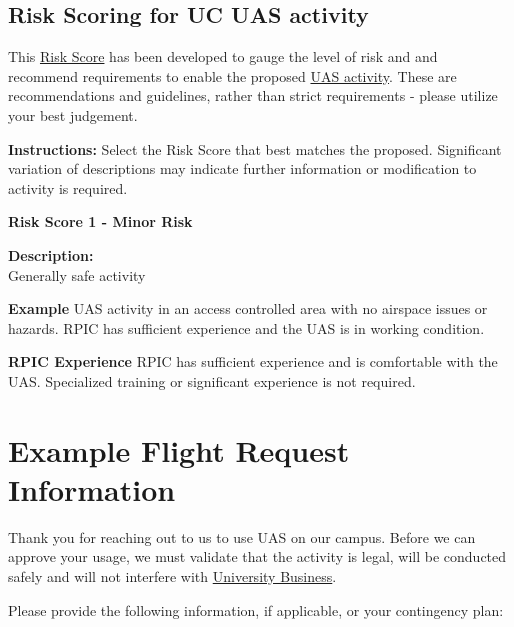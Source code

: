 \documentclass[
]{book}
\begin{document}
\hypertarget{risk-scoring-for-uc-uas-activity}{%
\section{Risk Scoring for UC UAS activity}\label{risk-scoring-for-uc-uas-activity}}

This \protect\hyperlink{riskscore}{Risk Score} has been developed to gauge the level of risk and and recommend requirements to enable the proposed \protect\hyperlink{UASactivity}{UAS activity}. These are recommendations and guidelines, rather than strict requirements - please utilize your best judgement.

\textbf{Instructions:} Select the Risk Score that best matches the proposed. Significant variation of descriptions may indicate further information or modification to activity is required.

\begin{graybox}

\begin{center}

\textbf{Risk Score 1 - Minor Risk}

\end{center}

\textbf{Description:}\\
Generally safe activity

\textbf{Example}
UAS activity in an access controlled area with no airspace issues or hazards. RPIC has sufficient experience and the UAS is in working condition.

\textbf{RPIC Experience}
RPIC has sufficient experience and is comfortable with the UAS. Specialized training or significant experience is not required.

\end{graybox}

\hypertarget{ch-request}{%
\chapter{Example Flight Request Information}\label{ch-request}}

Thank you for reaching out to us to use UAS on our campus. Before we can approve your usage, we must validate that the activity is legal, will be conducted safely and will not interfere with \protect\hyperlink{UB}{University Business}.

Please provide the following information, if applicable, or your contingency plan:
\end{document}
